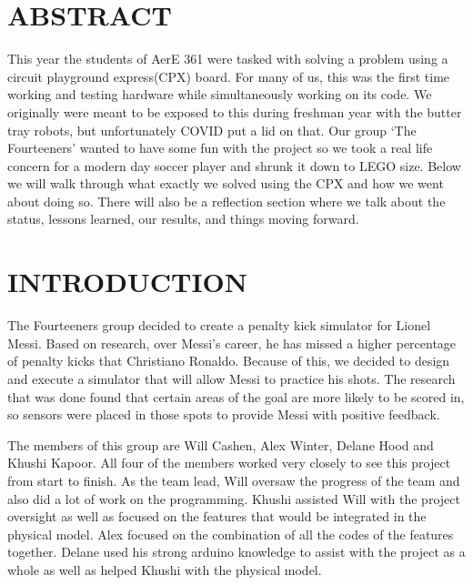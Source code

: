 \documentclass[12pt]{article}
\begin{document}
\tableofcontents
\pagebreak

\section{ABSTRACT}
This year the students of AerE 361 were tasked with solving a problem using a circuit playground express(CPX) board.
For many of us, this was the first time working and testing hardware while simultaneously working on its code. We originally
were meant to be exposed to this during freshman year with the butter tray robots, but unfortunately COVID put a lid on that.
Our group `The Fourteeners' wanted to have some fun with the project so we took a real life concern for a modern day soccer player
and shrunk it down to LEGO size. Below we will walk through what exactly we solved using the CPX and how we went about doing so.
There will also be a reflection section where we talk about the status, lessons learned, our results, and things moving forward.

\section{INTRODUCTION}
The Fourteeners group decided to create a penalty kick simulator for Lionel Messi. Based on research, over Messi's career, he has missed a higher percentage of penalty kicks that Christiano Ronaldo. Because of this, we decided to design and execute a simulator that will allow Messi to practice his shots. The research that was done found that certain areas of the goal are more likely to be scored in, so sensors were placed in those spots to provide Messi with positive feedback. 

The members of this group are Will Cashen, Alex Winter, Delane Hood and Khushi Kapoor. All four of the members worked very closely to see this project from start to finish. As the team lead, Will oversaw the progress of the team and also did a lot of work on the programming. Khushi assisted Will with the project oversight as well as focused on the features that would be integrated in the physical model. Alex focused on the combination of all the codes of the features together. Delane used his strong arduino knowledge to assist with the project as a whole as well as helped Khushi with the physical model. 
\end{document}
